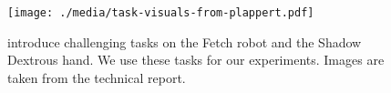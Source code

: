 %
\begin{figure}%
  \texttt{[image: ./media/task-visuals-from-plappert.pdf]}%
  \caption{\citet{plappert2018multi} introduce challenging tasks on the
Fetch robot and the Shadow Dextrous hand. We use these tasks for our experiments.
    Images are taken from the technical report.}%
  \label{fig:envs}%
\end{figure}%
% 
